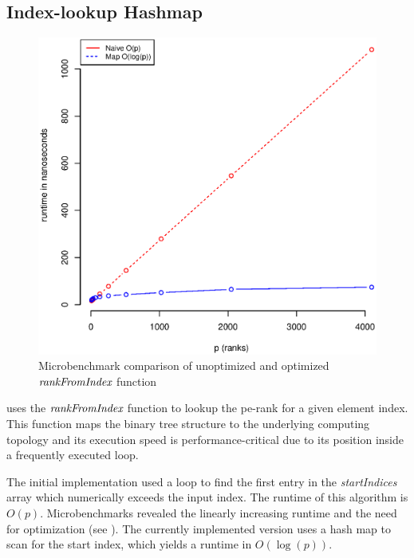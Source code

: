\subsection{Index-lookup Hashmap}
\label{sec:IndexLookupHashmap}

\begin{figure}
\centering
\includegraphics[scale=0.55]{figures/microbenchmark_rank_from_index.eps}
\caption{Microbenchmark comparison of unoptimized and optimized $\textit{rankFromIndex}$ function}
\label{fig:microbenchmarkRankFromIndex}

\end{figure}

 uses the $\textit{rankFromIndex}$ function to lookup the \gls{pe}-rank for a given element index.
This function maps the binary tree structure to the underlying computing topology and its execution speed is performance-critical due to its position inside a frequently executed loop.

The initial implementation used a loop to find the first entry in the \textit{startIndices} array which numerically exceeds the input index.
The runtime of this algorithm is $O(p)$.
Microbenchmarks revealed the linearly increasing runtime and the need for optimization (see ).
The currently implemented version uses a hash map to scan for the start index, which yields a runtime in $O(\log(p))$.

